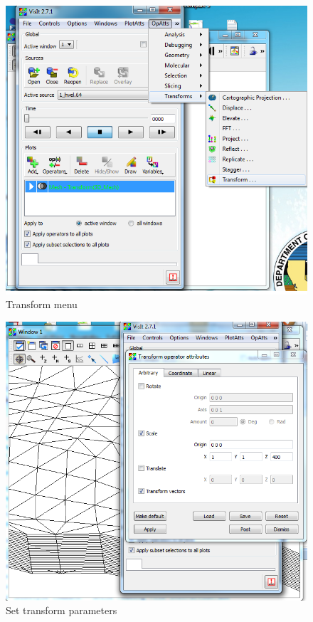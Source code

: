 \documentclass[12pt]{report}
\begin{document}
   
        \begin{figure}
        \includegraphics{transformPar}
        \caption{Transform menu}
        \label{figure:transformPar}
        \end{figure} 
      
        \begin{figure}
        \includegraphics{transformParSet}
        \caption{Set transform parameters }
        \label{figure:transformParSet}
        \end{figure} 
        
\end{document}
